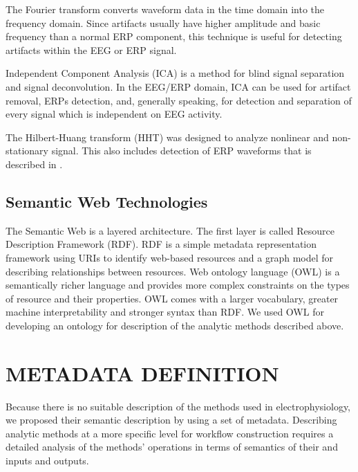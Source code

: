 \documentclass[a4paper,twoside]{article}
\begin{document}
The Fourier transform converts waveform data in the time domain into the frequency domain. Since artifacts usually have higher amplitude and basic frequency than a normal ERP component, this technique is useful for detecting artifacts within the EEG or ERP signal.

Independent Component Analysis (ICA) \cite{Hyv01} is a method for blind signal separation and signal deconvolution. In the EEG/ERP domain, ICA can be used for artifact removal, ERPs detection, and, generally speaking, for detection and separation of every signal which is independent on EEG activity.

The  Hilbert-Huang  transform  (HHT)  was  designed  to  analyze  nonlinear  and  non-stationary signal. This also includes detection of ERP waveforms that is described in \cite{Ciniburk11}.

\subsection{Semantic Web Technologies}

\noindent The Semantic Web is a layered architecture. The first layer is called Resource Description Framework (RDF). RDF is a simple metadata representation framework using URIs to identify web-based resources and a graph model for describing relationships between resources. Web ontology language (OWL) is a semantically richer language and provides more complex constraints on the types of resource and their properties. OWL comes with a larger vocabulary, greater machine interpretability and stronger syntax than RDF. We used OWL for developing an ontology for description of the analytic methods described above.

\section{\uppercase{Metadata Definition}}

\noindent Because there is no suitable description of the methods used in electrophysiology, we proposed their semantic description by using a set of metadata. Describing analytic methods at a more specific level for workflow construction requires a detailed analysis of the methods' operations in terms of semantics of their and inputs and outputs.
\end{document}
